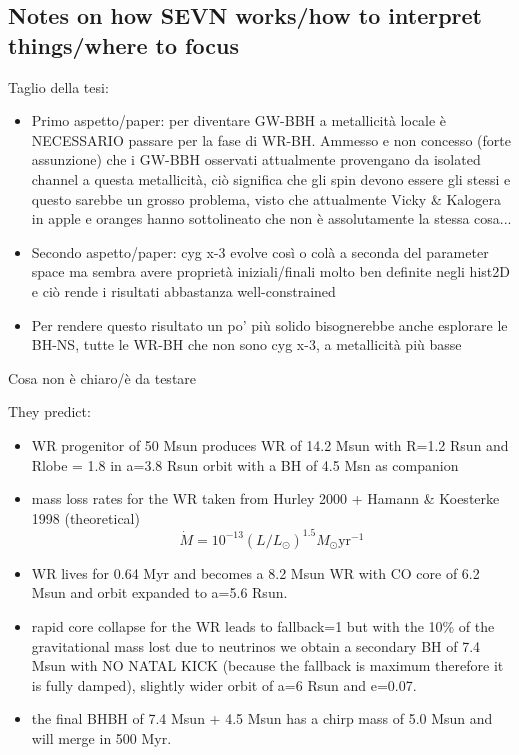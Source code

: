 \documentclass[a4paper,titlepage]{book}     	%
\newcommand{\sun}{\ensuremath{_\odot}}
\newcommand{\msun}{\ensuremath{M\sun}}
\newcommand{\yr}{\text{yr}}
\begin{document}
\subsection{Notes on how SEVN works/how to interpret things/where to focus}
Taglio della tesi: 
\begin{itemize}
	\item Primo aspetto/paper: per diventare GW-BBH a metallicità locale è NECESSARIO passare per la fase di WR-BH. Ammesso e non concesso (forte assunzione) che i GW-BBH osservati attualmente provengano da isolated channel a questa metallicità, ciò significa che gli spin devono essere gli stessi e questo sarebbe un grosso problema, visto che attualmente Vicky \& Kalogera in apple e oranges hanno sottolineato che non è assolutamente la stessa cosa...
	\item Secondo aspetto/paper: cyg x-3 evolve così o colà a seconda del parameter space ma sembra avere proprietà iniziali/finali molto ben definite negli hist2D e ciò rende i risultati abbastanza well-constrained
	\item Per rendere questo risultato un po' più solido bisognerebbe anche esplorare le BH-NS, tutte le WR-BH che non sono cyg x-3, a metallicità più basse
\end{itemize}

Cosa non è chiaro/è da testare

 

They predict:\\
\begin{itemize}
	\item WR progenitor of 50 Msun produces WR of 14.2 Msun with R=1.2 Rsun and Rlobe = 1.8 in a=3.8 Rsun orbit with a BH of 4.5 Msn as companion
	\item mass loss rates for the WR taken from Hurley 2000 + Hamann \& Koesterke 1998 (theoretical)
	\[\dot{M} = 10^{-13}(L/L_\odot)^{1.5} \msun \yr^{-1}\]
	\item WR lives for 0.64 Myr and becomes a 8.2 Msun WR with CO core of 6.2 Msun and orbit expanded to a=5.6 Rsun. 
	\item rapid core collapse for the WR leads to fallback=1 but with the 10\% of the gravitational mass lost due to neutrinos we obtain a secondary BH of 7.4 Msun with NO NATAL KICK (because the fallback is maximum therefore it is fully damped), slightly wider orbit of a=6 Rsun and e=0.07.
	\item the final BHBH of 7.4 Msun + 4.5 Msun has a chirp mass of 5.0 Msun and will merge in 500 Myr.
\end{itemize}
\end{document}
